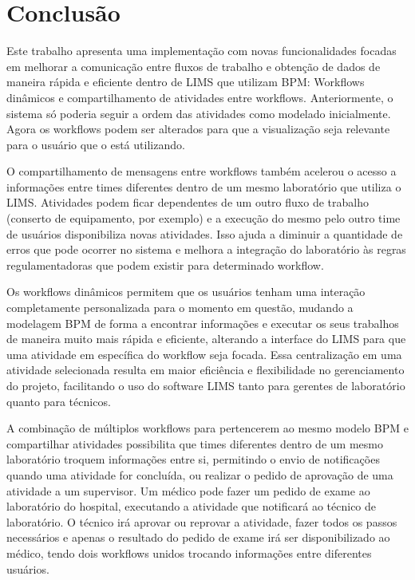 \section{Conclusão}

Este trabalho apresenta uma implementação com novas funcionalidades focadas em melhorar a comunicação entre fluxos de trabalho e obtenção de dados de maneira rápida e eficiente dentro de LIMS que utilizam BPM: Workflows dinâmicos e compartilhamento de atividades entre workflows. Anteriormente, o sistema só poderia seguir a ordem das atividades como modelado inicialmente. Agora os workflows podem ser alterados para que a visualização seja relevante para o usuário que o está utilizando.

O compartilhamento de mensagens entre workflows também acelerou o acesso a informações entre times diferentes dentro de um mesmo laboratório que utiliza o LIMS. Atividades podem ficar dependentes de um outro fluxo de trabalho (conserto de equipamento, por exemplo) e a execução do mesmo pelo outro time de usuários disponibiliza novas atividades. Isso ajuda a diminuir a quantidade de erros que pode ocorrer no sistema e melhora a integração do laboratório às regras regulamentadoras que podem existir para determinado workflow.

Os workflows dinâmicos permitem que os usuários tenham uma interação completamente personalizada para o momento em questão, mudando a modelagem BPM de forma a encontrar informações e executar os seus trabalhos de maneira muito mais rápida e eficiente, alterando a interface do LIMS para que uma atividade em específica do workflow seja focada.
Essa centralização em uma atividade selecionada resulta em maior eficiência e flexibilidade no gerenciamento do projeto, facilitando o uso do software LIMS tanto para gerentes de laboratório quanto para técnicos.

A combinação de múltiplos workflows para pertencerem ao mesmo modelo BPM e compartilhar atividades possibilita que times diferentes dentro de um mesmo laboratório troquem informações entre si, permitindo o envio de notificações quando uma atividade for concluída, ou realizar o pedido de aprovação de uma atividade a um supervisor. Um médico pode fazer um pedido de exame ao laboratório do hospital, executando a atividade que notificará ao técnico de laboratório. O técnico irá aprovar ou reprovar a atividade, fazer todos os passos necessários e apenas o resultado do pedido de exame irá ser disponibilizado ao médico, tendo dois workflows unidos trocando informações entre diferentes usuários.


